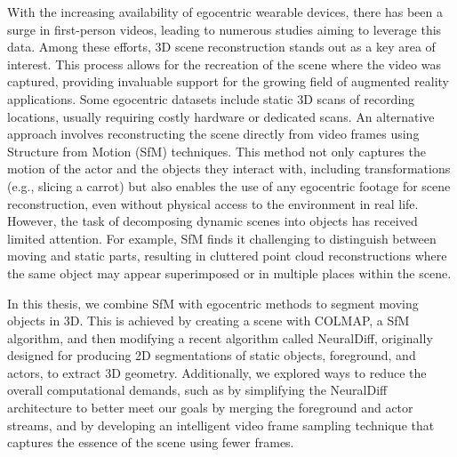 With the increasing availability of egocentric wearable devices, 
there has been a surge in first-person videos, leading to numerous studies
aiming to leverage this data. Among these efforts, 3D scene
reconstruction stands out as a key area of interest. This process allows for
the recreation of the scene where the video was captured, providing
 invaluable support for the growing field of augmented reality applications.
Some egocentric datasets include static 3D scans of recording locations,
usually requiring costly hardware or dedicated scans.
An alternative approach involves reconstructing the scene
directly from video frames using Structure from Motion (SfM)
techniques. This method not only captures the motion of the actor
and the objects they interact with, including transformations 
(e.g., slicing a carrot) but also enables the use of any egocentric 
footage for scene reconstruction, even without physical access to the 
environment in real life. However, the task of decomposing dynamic 
scenes into objects has received limited attention. For example, SfM 
finds it challenging to distinguish between moving and static parts, 
resulting in cluttered point cloud reconstructions where the same
object may appear superimposed or in multiple places within the scene.

In this thesis, we combine SfM with egocentric methods to segment moving
objects in 3D. This is achieved by creating a scene with COLMAP,
a SfM algorithm, and then modifying a recent algorithm called 
NeuralDiff, originally designed for producing 2D segmentations of
static objects, foreground, and actors, to extract 3D geometry. 
Additionally, we explored ways to reduce the overall computational 
demands, such as by simplifying the NeuralDiff architecture to better
meet our goals by merging the foreground and actor streams,
and by developing an intelligent video frame sampling technique that
captures the essence of the scene using fewer frames.
